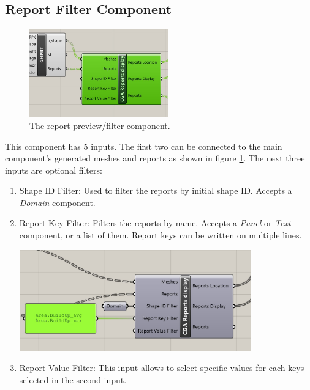 \subsection{Report Filter Component}

\begin{figure}[h]
    \centering
    \includegraphics[width=60mm]{res/man_gh_filter_comp_connections.jpg}
    \caption{The report preview/filter component.}
    \label{fig:gh_filter_first}
\end{figure}

This component has 5 inputs. The first two can be connected to the main component's generated meshes and reports as shown in figure \ref{fig:gh_filter_first}. The next three inputs are optional filters:
\begin{enumerate}
    \item Shape ID Filter: Used to filter the reports by initial shape ID. Accepts a \textit{Domain} component.
    \item Report Key Filter: Filters the reports by name. Accepts a \textit{Panel} or \textit{Text} component, or a list of them. Report keys can be written on multiple lines.\\
   \begin{minipage}{\linewidth}
        \centering
        \includegraphics[width=10cm]{res/man_gh_filter_example.jpg}
    \end{minipage}
    \item Report Value Filter: This input allows to select specific values for each keys selected in the second input.
\end{enumerate}

